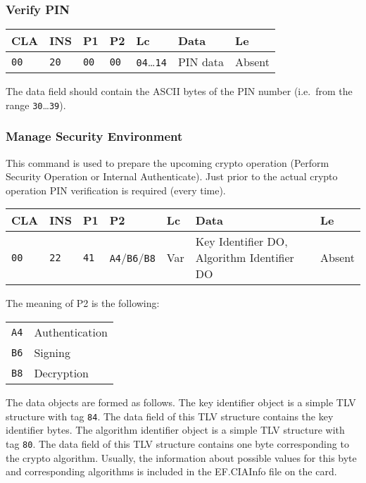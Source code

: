 \documentclass{article}
\begin{document}
\subsubsection{Verify PIN}

\begin{flushleft}
\begin{tabular}{|l|l|l|l|l|l|l|}
\hline
CLA & INS & P1 & P2 & Lc & Data & Le \\
\hline
\texttt{00} & \texttt{20} & \texttt{00} & \texttt{00} &
\texttt{04}\dots\texttt{14} & PIN data & Absent \\
\hline
\end{tabular}
\end{flushleft}
The data field should contain the ASCII bytes 
of the PIN number (i.e.\ from the range \texttt{30}\dots\texttt{39}).

\subsubsection{Manage Security Environment}

This command is used to prepare the upcoming crypto operation (Perform Security Operation or Internal
Authenticate). Just prior to the actual crypto operation PIN verification is required (every time).
\begin{flushleft}
\begin{tabular}{|l|l|l|l|l|l|l|}
\hline
CLA & INS & P1 & P2 & Lc & Data & Le \\
\hline
\texttt{00} & \texttt{22} & \texttt{41} & \texttt{A4}/\texttt{B6}/\texttt{B8} &
Var & Key Identifier DO, Algorithm Identifier DO & Absent \\
\hline
\end{tabular}
\end{flushleft}
The meaning of P2 is the following:
\begin{flushleft}
\begin{tabular}{|l|l|}
\hline
\texttt{A4} & Authentication \\
\texttt{B6} & Signing \\
\texttt{B8} & Decryption \\
\hline
\end{tabular}
\end{flushleft}
The data objects are formed as follows. The key identifier object is a simple TLV structure with
tag \texttt{84}. The data field of this TLV structure contains the key identifier bytes.
The algorithm identifier object is a simple TLV structure with tag \texttt{80}. The data field of 
this TLV structure contains one byte corresponding to the crypto algorithm. Usually, the information about 
possible values for this byte and corresponding algorithms is included in the EF.CIAInfo
file on the card.
\end{document}
